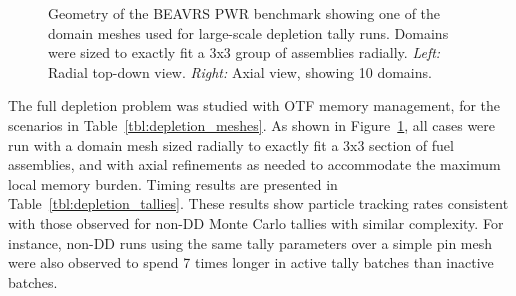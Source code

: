 \documentclass[12pt,twoside]{mitthesis-exec}
\begin{document}
\begin{figure}
{\begin{tikzpicture}
      
      \end{tikzpicture}
    }

    \caption{Geometry of the BEAVRS PWR benchmark showing one of the domain
    meshes used for large-scale depletion tally runs. Domains were sized to
    exactly fit a 3x3 group of assemblies radially. \emph{Left:} Radial top-down
    view. \emph{Right:} Axial view, showing 10 domains.\label{fig:depl_mesh}}
\end{figure} 

The full depletion problem was studied with OTF memory management, for the
scenarios in Table~\ref{tbl:depletion_meshes}. As shown in
Figure~\ref{fig:depl_mesh}, all cases were run with a domain mesh sized radially
to exactly fit a 3x3 section of fuel assemblies, and with axial refinements as
needed to accommodate the maximum local memory burden. Timing results are
presented in Table~\ref{tbl:depletion_tallies}. These results show particle
tracking rates consistent with those observed for non-DD Monte Carlo tallies
with similar complexity. For instance, non-DD runs using the same tally
parameters over a simple pin mesh were also observed to spend 7 times longer in
active tally batches than inactive batches.
\end{document}
